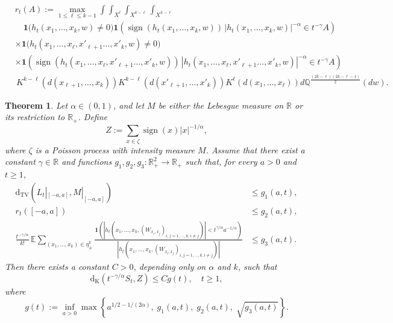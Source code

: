 \documentclass{article}
\newtheorem{theorem}{Theorem}[section]
\theoremstyle{definition}
\numberwithin{equation}{section}
\theoremstyle{remark}
\begin{document}
\begin{align*}
  &  r_t(A) := \max_{1 \leq \ell \leq k-1} 
\int \int_{X^\ell}  
\int_{X^{k - \ell}}\int_{X^{k - \ell}} \\
& \quad \mathbf{1}\big(  h_t( {x}_1, \ldots, {x}_k , w ) \neq 0  \big) \mathbf{1}\left( \operatorname{sign}(h_t(x_1, \ldots, x_k,w)) \, |h_t(x_1, \ldots, x_k,w)|^{-\alpha} \in t^{-\gamma} A \right)
 \\
&  \times \mathbf{1}\big( h_t( {x}_1, \ldots, {x}_\ell, {x}'_{\ell+1} \ldots, {x}'_{k}, w ) \neq 0 \big) \\
& \times \mathbf{1}\left( \operatorname{sign}(h_t({x}_1, \ldots, {x}_\ell, {x}'_{\ell+1} \ldots, {x}'_{k},w)) \, |h_t({x}_1, \ldots, {x}_\ell, {x}'_{\ell+1} \ldots, {x}'_{k},w)|^{-\alpha} \in t^{-\gamma} A \right)\\
&\,{K}^{k - \ell}(d({x}_{\ell+1}, \ldots, {x}_k))   {K}^{k - \ell}(d({x}'_{\ell+1}, \ldots, {x}'_k)) {K}^\ell(d({x}_1, \ldots, {x}_\ell)) d\mathbb{Q}^{\frac{(2k - \ell) (2k -\ell-1)}{2}} (dw) .
\end{align*}

\begin{theorem}\label{stable}
Let \( \alpha \in (0, 1) \), and let \( M \) be either the Lebesgue measure on \( \mathbb{R} \) or its restriction to \( \mathbb{R}_+ \). Define
\[
Z := \sum_{x \in \zeta} \operatorname{sign}(x) |x|^{-1/\alpha},
\]
where \( \zeta \) is a Poisson process with intensity measure \( M\). Assume that there exist a constant \( \gamma \in \mathbb{R} \) and functions \( g_1, g_2, g_3 \colon \mathbb{R}_+^2 \to \mathbb{R}_+ \) such that, for every \( a > 0 \) and \( t \ge 1 \),
\begin{align*}
\mathrm{d}_{\mathrm{TV}}(L_t|_{[-a,a]}, M|_{[-a,a]}) &\le g_1(a, t), \\
r_t([-a,a]) &\le g_2(a, t), \\
\frac{t^{-\gamma/\alpha}}{k!} \, \mathbb{E} \sum_{(x_1, \ldots, x_k) \in \eta^k_{\neq}}
\frac{\mathbf{1}(|h_t(x_1, \ldots, x_k,(W_{x_i,x_j})_{i,j =1,\ldots, k, i \neq j})| < t^{\gamma/\alpha} a^{-1/\alpha})}{|h_t(x_1, \ldots, x_k,(W_{x_i,x_j})_{i,j =1,\ldots, k, i \neq j})|}
&\le g_3(a, t).
\end{align*}
Then there exists a constant \( C > 0 \), depending only on \( \alpha \) and \( k \), such that
\[
	\mathrm{d}_{\mathrm{K}}(t^{-\gamma/\alpha} S_t, Z) \le C g(t), \quad t \ge 1,
\]
where
\[
g(t) := \inf_{a > 0} \max\left\{ a^{1/2 - 1/(2\alpha)},\; g_1(a,t),\; g_2(a,t),\; \sqrt{g_3(a,t)} \right\}.
\]
\end{theorem}
\end{document}
